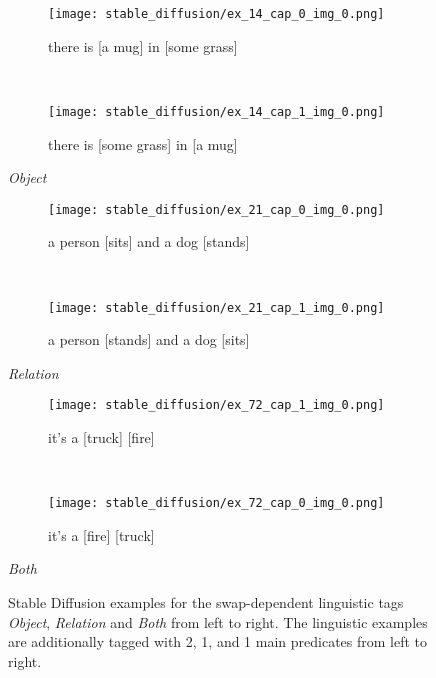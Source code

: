 \begin{figure}
\centering
    \begin{minipage}[t]{.30\textwidth}
        \begin{subfigure}[t]{\textwidth}
        \centering
        \texttt{[image: stable\_diffusion/ex\_14\_cap\_0\_img\_0.png]}
        \caption{there is [a mug] in [some grass]}
        \end{subfigure}\\
        \begin{subfigure}[t]{\textwidth}
        \centering
        \texttt{[image: stable\_diffusion/ex\_14\_cap\_1\_img\_0.png]}
        \caption{there is [some grass] in [a mug]}
        \end{subfigure}%
        \caption*{\textit{Object}}
    \end{minipage}
    \hfill
    \begin{minipage}[t]{.30\textwidth}
        \begin{subfigure}[t]{\textwidth}
        \centering
        \texttt{[image: stable\_diffusion/ex\_21\_cap\_0\_img\_0.png]}
        \caption{a person [sits] and a dog [stands]}
        \end{subfigure}\\
        \begin{subfigure}[t]{\textwidth}
        \centering
        \texttt{[image: stable\_diffusion/ex\_21\_cap\_1\_img\_0.png]}
        \caption{a person [stands] and a dog [sits]}
        \end{subfigure}%
        \caption*{\textit{Relation}}
    \end{minipage}
    \hfill
    \begin{minipage}[t]{.30\textwidth}
        \begin{subfigure}[t]{\textwidth}
        \centering
        \texttt{[image: stable\_diffusion/ex\_72\_cap\_1\_img\_0.png]}
        \caption{it's a [truck] [fire]}
        \end{subfigure}\\
        \begin{subfigure}[t]{\textwidth}
        \centering
        \texttt{[image: stable\_diffusion/ex\_72\_cap\_0\_img\_0.png]}
        \caption{it's a [fire] [truck]}
        \end{subfigure}%
        \caption*{\textit{Both}}
    \end{minipage}%
    \caption{Stable Diffusion examples for the swap-dependent linguistic tags \textit{Object}, \textit{Relation} and \textit{Both} from left to right. The linguistic examples are additionally tagged with 2, 1, and 1 main predicates from left to right.}
    \label{fig:stable-diffusion-examples-linguistic}
\end{figure}

